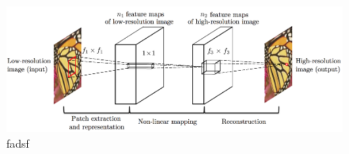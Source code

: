\documentclass[10pt]{article}
\begin{document}
\begin{figure}[H]
    \centering
    \includegraphics[scale=0.4]{figs/cnn.png}
    \caption{fadsf}
    \label{fig:1}
\end{figure}






\end{document}
